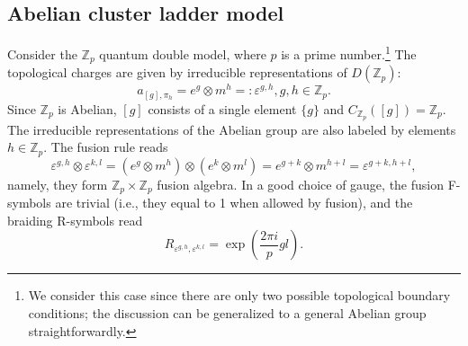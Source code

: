 \documentclass[a4paper,11pt]{article}
\theoremstyle{theorem}
\theoremstyle{remark}
\newcommand{\Zbb}{\mathbb{Z}}
\begin{document}
\subsection{Abelian cluster ladder model}

Consider the \(\mathbb{Z}_p\) quantum double model, where \(p\) is a prime number.\footnote{We consider this case since there are only two possible topological boundary conditions; the discussion can be generalized to a general Abelian group straightforwardly.}
The topological charges are given by irreducible representations of \( D(\mathbb{Z}_p) \):  
\begin{equation}
    a_{[g],\pi_h} = e^g \otimes m^h=:\varepsilon^{g,h}, g,h\in \Zbb_p.
\end{equation}  
Since \( \mathbb{Z}_p \) is Abelian, \( [g] \) consists of a single element \( \{g\} \) and \( C_{\mathbb{Z}_p}([g]) = \mathbb{Z}_p \). The irreducible representations of the Abelian group are also labeled by elements \( h \in \mathbb{Z}_p \).
The fusion rule reads
\begin{equation}
\varepsilon^{g,h}\otimes \varepsilon^{k,l}=  (e^g \otimes m^h) \otimes (e^{k} \otimes m^{l})= e^{g+k}\otimes m^{h+l}=\varepsilon^{g+k,h+l},
\end{equation}
namely, they form $\Zbb_p\times \Zbb_p$ fusion algebra. In a good choice of gauge, the fusion F-symbols are trivial (i.e., they equal to 1 when allowed by fusion), and the braiding R-symbols read
\begin{equation}
    R_{\varepsilon^{g,h},\varepsilon^{k,l}}=\exp(\frac{2\pi i}{p} gl).
\end{equation}
\end{document}
